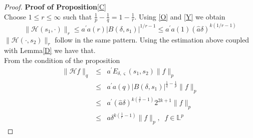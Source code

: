 \documentclass[10pt]{article}
\theoremstyle{definition}
\numberwithin{equation}{section}
\begin{document}
	\begin{proof}{\textbf{Proof of Proposition}\eqref{C}}\\
		\normalfont
		Choose $1\leq r\leq \infty$ such that $\frac{1}{p} - \frac{1}{q} = 1 - \frac{1}{r}$. Using \eqref{O} and \eqref{Y} we obtain
		$$ \lVert \mathscr{H}(s_1, \cdot) \rVert_r \leq a^{\prime} a(r)|B(\delta, s_1)|^{1/r -1} \leq a^{\prime} a(1) (\hat{a} \delta)^{k(1/r -1)} $$
		$\lVert \mathscr{H}(\cdot, s_2) \rVert_r $ follow in the same pattern. Using the estimation above coupled with Lemma\eqref{D} we have that.\\
		From the condition of the proposition\\
		\begin{eqnarray*}
			\lVert \mathscr{H}f\rVert_q &\leq & a^{\prime} E_{\delta,\varsigma}(s_1,s_2)\lVert f \rVert_p\\
			& \leq & a^{\prime}a(q)|B(\delta,s_1)|^{\frac{1}{q}-\frac{1}{p}} \lVert f \rVert_p\\
			& \leq & a^{\prime}(\hat{a}\delta)^{k(\frac{1}{r}-1)} 2^{2k+1} \lVert f \rVert_p\\
			& \leq & a\delta^{k(\frac{1}{r}-1)} \lVert f \rVert_p, \;\; f\in \mathbb{L}^p
		\end{eqnarray*}
	\end{proof}
	
\end{document}
